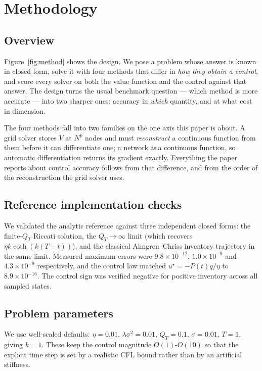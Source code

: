 \documentclass[conference]{IEEEtran}
\begin{document}
\section{Methodology}\label{sec:setup}

\subsection{Overview}
Figure~\ref{fig:method} shows the design. We pose a problem whose answer is known in closed form,
solve it with four methods that differ in \emph{how they obtain a control}, and score every solver
on both the value function and the control against that answer. The design turns the usual
benchmark question --- which method is more accurate --- into two sharper ones: accuracy in
\emph{which} quantity, and at what cost in dimension.



The four methods fall into two families on the one axis this paper is about. A grid solver stores
$V$ at $N^p$ nodes and must \emph{reconstruct} a continuous function from them before it can
differentiate one; a network \emph{is} a continuous function, so automatic differentiation returns
its gradient exactly. Everything the paper reports about control accuracy follows from that
difference, and from the order of the reconstruction the grid solver uses.

\subsection{Reference implementation checks}
We validated the analytic reference against three independent closed forms: the
finite-$Q_T$ Riccati solution, the $Q_T\to\infty$ limit (which recovers $\eta k\coth(k(T-t))$), and
the classical Almgren--Chriss inventory trajectory in the same limit. Measured maximum errors
were $9.8\times10^{-12}$, $1.0\times10^{-9}$ and $4.3\times10^{-9}$ respectively, and the
control law matched $u^\star=-P(t)q/\eta$ to $8.9\times10^{-16}$. The control sign was verified
negative for positive inventory across all sampled states.

\subsection{Problem parameters}
We use well-scaled defaults: $\eta = 0.01$, $\lambda\sigma^2 = 0.01$, $Q_T = 0.1$,
$\sigma = 0.01$, $T=1$, giving $k=1$. These keep the control magnitude $O(1)$-$O(10)$ so that
the explicit time step is set by a realistic CFL bound rather than by an artificial stiffness.
\end{document}

